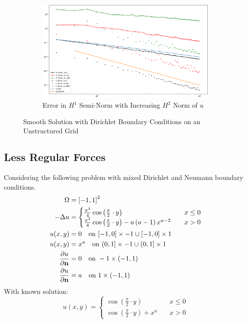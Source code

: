\documentclass[11pt,a4paper]{article}
\begin{document}
\begin{figure}
\begin{subfigure}{.8\textwidth}
    \centering
    \includegraphics[width=.9\linewidth]{errors_smooth_irreg}
    \caption{Error in $H^1$ Semi-Norm with Increasing $H^2$ Norm of $u$}
  \end{subfigure}
  \label{fig:smooth_dirichlet_unstr_errs}
  \caption{Smooth Solution with Dirichlet Boundary Conditions on an Unstructured Grid}
\end{figure}


\subsection*{Less Regular Forces}
Considering the following problem with mixed Dirichlet and Neumann boundary conditions.
\begin{equation}
  \label{eq:poisson_less_smooth_prob}
  \begin{split}
    \Omega &= \left[-1,1\right]^2\\
    -\Delta u &= \begin{cases}
      \frac{\pi^2}{4} \operatorname{cos}\left(\frac{\pi}{2} \cdot y\right) \quad &x \le 0\\
      \frac{\pi^2}{4} \operatorname{cos}\left(\frac{\pi}{2} \cdot y\right) - a\left(a-1\right)x^{a-2} \quad &x > 0
    \end{cases}\\
    u(x,y) &= 0 \quad \text{on } [-1,0] \times -1 \cup [-1,0] \times 1\\
    u(x,y) &= x^a \quad \text{on } (0,1] \times -1 \cup (0,1] \times 1\\
    \frac{\partial u}{\partial {\bf n}} &= 0 \quad \text{on } -1 \times (-1,1)\\
    \frac{\partial u}{\partial {\bf n}} &= a \quad \text{on } 1 \times (-1,1)
  \end{split}
\end{equation}
With known solution:
\begin{equation*}
  u(x,y) = \begin{cases}
    \operatorname{cos}\left(\frac{\pi}{2} \cdot y\right) \quad &x \le 0\\
    \operatorname{cos}\left(\frac{\pi}{2} \cdot y\right) + x^a \quad &x > 0
  \end{cases}
\end{equation*}
\end{document}
